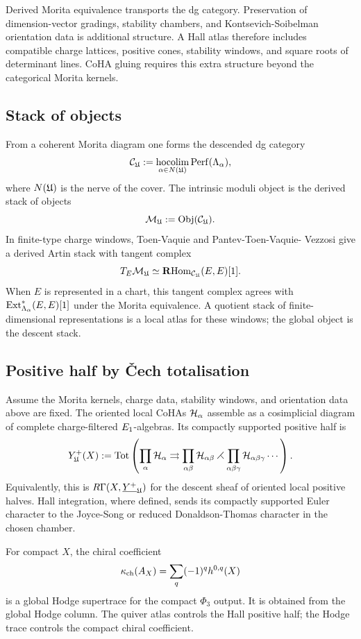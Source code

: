 Derived Morita equivalence transports the dg category. Preservation of
dimension-vector gradings, stability chambers, and
Kontsevich-Soibelman orientation data is additional structure.  A Hall
atlas therefore includes compatible charge lattices, positive cones,
stability windows, and square roots of determinant lines.  CoHA gluing
requires this extra structure beyond the categorical Morita kernels.

\subsection*{Stack of objects}

From a coherent Morita diagram one forms the descended dg category
\[
  \mathcal C_{\mathfrak U}
  :=
  \operatorname*{hocolim}_{\alpha\in N(\mathfrak U)}
  \mathrm{Perf}(\Lambda_\alpha),
\]
where \(N(\mathfrak U)\) is the nerve of the cover.  The intrinsic moduli object
is the derived stack of objects
\[
  \mathcal M_{\mathfrak U}:=\mathrm{Obj}(\mathcal C_{\mathfrak U}).
\]
In finite-type charge windows, Toen-Vaquie and Pantev-Toen-Vaquie-
Vezzosi give a derived Artin stack with tangent complex
\[
  T_E\mathcal M_{\mathfrak U}\simeq \mathbf{R}\!\operatorname{Hom}_{\mathcal C_{\mathfrak U}}(E,E)[1].
\]
When \(E\) is represented in a chart, this tangent complex agrees with
\(\mathrm{Ext}^*_{\Lambda_\alpha}(E,E)[1]\) under the Morita equivalence.  A
quotient stack of finite-dimensional representations is a local atlas
for these windows; the global object is the descent stack.

\subsection*{Positive half by \v{C}ech totalisation}

Assume the Morita kernels, charge data, stability windows, and
orientation data above are fixed.  The oriented local CoHAs
\(\mathcal H_\alpha\) assemble as a cosimplicial diagram of complete
charge-filtered \(E_{1}\)-algebras.  Its compactly supported positive
half is
\[
  Y^{+}_{\mathfrak U}(X)
  :=
  \operatorname{Tot}\left(
  \prod_\alpha \mathcal H_\alpha
  \rightrightarrows
  \prod_{\alpha\beta}\mathcal H_{\alpha\beta}
  \rightthreetimes
  \prod_{\alpha\beta\gamma}\mathcal H_{\alpha\beta\gamma}
  \cdots
  \right).
\]
Equivalently, this is \(R\Gamma(X,\underline{Y^{+}}_{\mathfrak U})\) for the
descent sheaf of oriented local positive halves.  Hall integration,
where defined, sends its compactly supported Euler character to the
Joyce-Song or reduced Donaldson-Thomas character in the chosen chamber.

For compact \(X\), the chiral coefficient
\[
  \kappa_{\mathrm{ch}}(A_X)=\sum_q(-1)^q h^{0,q}(X)
\]
is a global Hodge supertrace for the compact \(\Phi_3\) output.  It is
obtained from the global Hodge column.  The quiver atlas controls the
Hall positive half; the Hodge trace controls the compact chiral
coefficient.

